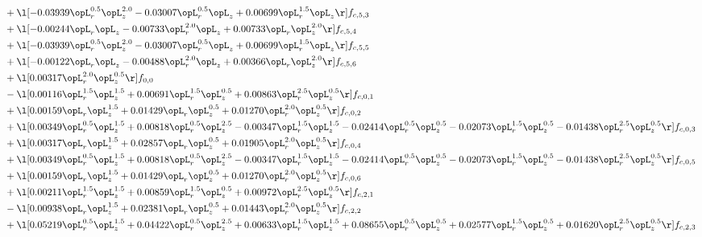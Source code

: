 \begin{alignat}{2}
& + \l[  -0.03939 \opL_r^{0.5} \opL_z^{2.0}   -0.03007 \opL_r^{0.5} \opL_z +  0.00699 \opL_r^{1.5} \opL_z  \r] f_{c,5,3} \nonumber \\ 
& + \l[  -0.00244 \opL_r \opL_z   -0.00733 \opL_r^{2.0} \opL_z +  0.00733 \opL_r \opL_z^{2.0}  \r] f_{c,5,4} \nonumber \\ 
& + \l[  -0.03939 \opL_r^{0.5} \opL_z^{2.0}   -0.03007 \opL_r^{0.5} \opL_z +  0.00699 \opL_r^{1.5} \opL_z  \r] f_{c,5,5} \nonumber \\ 
& + \l[  -0.00122 \opL_r \opL_z   -0.00488 \opL_r^{2.0} \opL_z +  0.00366 \opL_r \opL_z^{2.0}  \r] f_{c,5,6} \nonumber \\ 
& + \l[  0.00317 \opL_r^{2.0} \opL_z^{0.5}  \r] f_{0,0} \nonumber \\ 
& - \l[  0.00116 \opL_r^{1.5} \opL_z^{1.5} +  0.00691 \opL_r^{1.5} \opL_z^{0.5} +  0.00863 \opL_r^{2.5} \opL_z^{0.5}  \r] f_{c,0,1} \nonumber \\ 
& + \l[  0.00159 \opL_r \opL_z^{1.5} +  0.01429 \opL_r \opL_z^{0.5} +  0.01270 \opL_r^{2.0} \opL_z^{0.5}  \r] f_{c,0,2} \nonumber \\ 
& + \l[  0.00349 \opL_r^{0.5} \opL_z^{1.5} +  0.00818 \opL_r^{0.5} \opL_z^{2.5}   -0.00347 \opL_r^{1.5} \opL_z^{1.5}   -0.02414 \opL_r^{0.5} \opL_z^{0.5}   -0.02073 \opL_r^{1.5} \opL_z^{0.5}   -0.01438 \opL_r^{2.5} \opL_z^{0.5}  \r] f_{c,0,3} \nonumber \\ 
& + \l[  0.00317 \opL_r \opL_z^{1.5} +  0.02857 \opL_r \opL_z^{0.5} +  0.01905 \opL_r^{2.0} \opL_z^{0.5}  \r] f_{c,0,4} \nonumber \\ 
& + \l[  0.00349 \opL_r^{0.5} \opL_z^{1.5} +  0.00818 \opL_r^{0.5} \opL_z^{2.5}   -0.00347 \opL_r^{1.5} \opL_z^{1.5}   -0.02414 \opL_r^{0.5} \opL_z^{0.5}   -0.02073 \opL_r^{1.5} \opL_z^{0.5}   -0.01438 \opL_r^{2.5} \opL_z^{0.5}  \r] f_{c,0,5} \nonumber \\ 
& + \l[  0.00159 \opL_r \opL_z^{1.5} +  0.01429 \opL_r \opL_z^{0.5} +  0.01270 \opL_r^{2.0} \opL_z^{0.5}  \r] f_{c,0,6} \nonumber \\ 
& + \l[  0.00211 \opL_r^{1.5} \opL_z^{1.5} +  0.00859 \opL_r^{1.5} \opL_z^{0.5} +  0.00972 \opL_r^{2.5} \opL_z^{0.5}  \r] f_{c,2,1} \nonumber \\ 
& - \l[  0.00938 \opL_r \opL_z^{1.5} +  0.02381 \opL_r \opL_z^{0.5} +  0.01443 \opL_r^{2.0} \opL_z^{0.5}  \r] f_{c,2,2} \nonumber \\ 
& + \l[  0.05219 \opL_r^{0.5} \opL_z^{1.5} +  0.04422 \opL_r^{0.5} \opL_z^{2.5} +  0.00633 \opL_r^{1.5} \opL_z^{1.5} +  0.08655 \opL_r^{0.5} \opL_z^{0.5} +  0.02577 \opL_r^{1.5} \opL_z^{0.5} +  0.01620 \opL_r^{2.5} \opL_z^{0.5}  \r] f_{c,2,3} \nonumber \\ 

\end{alignat}
